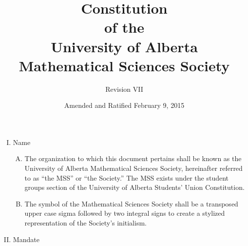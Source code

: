 \documentclass[11pt]{article}
\title{Constitution \\
of the\\
University of Alberta\\
Mathematical Sciences Society\\
}
\date{Amended and Ratified February 9, 2015}
\author{Revision VII}
\begin{document}
\maketitle

\begin{enumerate}[I.]
	\item Name
		\begin{enumerate}[A)]
			\item The organization to which this document pertains shall be known as the University of Alberta Mathematical Sciences Society, hereinafter referred to as ``the MSS'' or ``the Society.'' The MSS exists under the student groups section of the University of Alberta Students' Union Constitution.
			\item The symbol of the Mathematical Sciences Society shall be a transposed upper case sigma followed by two integral signs to create a stylized representation of the Society's initialism.
			\end{enumerate}
	\item Mandate
	

\end{enumerate}
\end{document}
